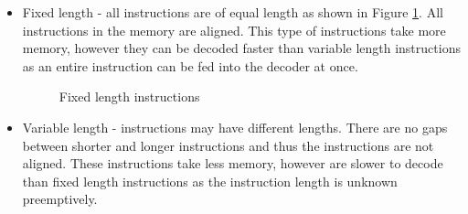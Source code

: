 \documentclass{report}
\begin{document}
\begin{itemize}
    \item{Fixed length - all instructions are of equal length as shown in Figure
        \ref{fig:fixed-instruction-length}. All instructions in the memory are
        aligned. This type of instructions take more memory, however they can
        be decoded faster than variable length instructions as an entire
        instruction can be fed into the decoder at once.}

    \begin {figure}[H]
    \centering
    \caption {Fixed length instructions}
    \label {fig:fixed-instruction-length}
    \end {figure}


    \item{Variable length - instructions may have different lengths. There are
        no gaps between shorter and longer instructions and thus the
        instructions are not aligned. These instructions take less memory,
        however are slower to decode than fixed length instructions as the
        instruction length is unknown preemptively.}
\end{itemize}
\end{document}
